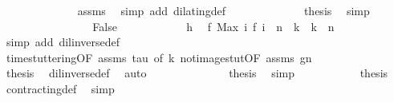 \begin{isabellebody}
\ \ \ \ \ \ \ \ \ \ \ \ \isamarkupfalse%
\ assms\ \isamarkupfalse%
\ {\isacharparenleft}simp\ add{\isacharcolon}\ dilating{\isacharunderscore}def{\isacharparenright}\isanewline
\ \ \ \ \ \ \ \ \ \ \isamarkupfalse%
\ \isamarkupfalse%
\ {\isacharquery}thesis\ \isamarkupfalse%
\ simp\isanewline
\ \ \ \ \ \ \isamarkupfalse%
\isanewline
\ \ \ \ \ \ \ \ \isamarkupfalse%
\ False\isanewline
\ \ \ \ \ \ \ \ \ \ \isamarkupfalse%
\ h\ \isamarkupfalse%
\ {\isacartoucheopen}f\ {\isacharparenleft}Max\ {\isacharbraceleft}i{\isachardot}\ f\ i\ {\isasymle}\ n{\isacharbraceright}{\isacharparenright}\ {\isacharless}\ k\ {\isasymand}\ k\ {\isasymle}\ n{\isacartoucheclose}\ \isamarkupfalse%
\ {\isacharparenleft}simp\ add{\isacharcolon}\ dil{\isacharunderscore}inverse{\isacharunderscore}def{\isacharparenright}\isanewline
\ \ \ \ \ \ \ \ \ \ \isamarkupfalse%
\ time{\isacharunderscore}stuttering{\isacharbrackleft}OF\ assms\ tau{\isacharcomma}\ of\ k{\isacharbrackright}\ not{\isacharunderscore}image{\isacharunderscore}stut{\isacharbrackleft}OF\ assms\ gn{\isacharbrackright}\isanewline
\ \ \ \ \ \ \ \ \ \ \ \ \isamarkupfalse%
\ {\isacharquery}thesis\ \isamarkupfalse%
\ dil{\isacharunderscore}inverse{\isacharunderscore}def\ \isamarkupfalse%
\ auto\isanewline
\ \ \ \ \ \ \isamarkupfalse%
\isanewline
\ \ \ \ \isacommand{{\isacharbraceright}}\isamarkupfalse%
\ \isamarkupfalse%
\ {\isacharquery}thesis\ \isamarkupfalse%
\ simp\isanewline
\ \ \isamarkupfalse%
\isanewline
\isanewline
\ \ \isamarkupfalse%
\ {\isacharasterisk}\ {}\ {}\ \isamarkupfalse%
\ {\isacharquery}thesis\ \isamarkupfalse%
\ contracting{\isacharunderscore}def\ \isamarkupfalse%
\ simp\isanewline
{}\isamarkupfalse%
%
\endisatagproof
{\isafoldproof}%
%
\isadelimproof
\isanewline
%
\endisadelimproof
%
\isadelimtheory
\isanewline
%
\endisadelimtheory
%
\isatagtheory
{}\isamarkupfalse%
%
\endisatagtheory
{\isafoldtheory}%
%
\isadelimtheory
%
\endisadelimtheory
%
\end{isabellebody}%
\endinput
